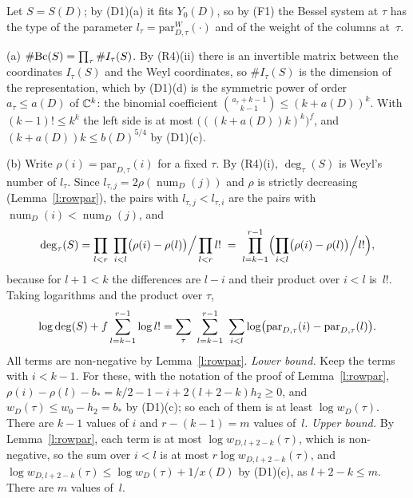 \documentclass[11pt,a4paper]{article}
\makeatletter
\theoremstyle{plainx}
\theoremstyle{uprightx}
\renewenvironment{proof}[1][Proof]{\par\pushQED{\qed}\normalfont\topsep0pt\partopsep0pt
  \trivlist\item[\hskip\labelsep\itshape #1.]\ignorespaces}{\popQED\endtrivlist\@endpefalse}
\newcommand{\Inp}[1]{\textup{(#1)}}
\newcommand{\scx}[1]{x(#1)}
\newcommand{\scb}[1]{b(#1)}
\newcommand{\aD}[1]{a(#1)}
\newcommand{\wt}[3]{w_{#1,#2}(#3)}                    %
\newcommand{\nw}[2]{w_{#1}(#2)}                       %
\newcommand{\rowPar}[3]{\mathrm{par}_{#1,#2}(#3)}     %
\newcommand{\parW}[3]{\mathrm{par}^{W}_{#1,#2}(#3)}   %
\newcommand{\SD}[1]{S(#1)}                            %
\newcommand{\Ys}[2]{Y_{#2}(#1)}                       %
\makeatother
\begin{document}
\begin{proof}[Proof of Theorem F]
Let $S=\SD{D}$; by \Inp{D1}(a) it fits $\Ys{D}{0}$, so by (F1) the Bessel system at $\tau$ has the type of the
parameter $l_\tau=\parW{D}{\tau}{\cdot}$ and of the weight of the columns at~$\tau$.

(a) $\#\mathrm{Bc}(S)=\prod_\tau\#I_\tau(S)$. By \Inp{R4}(ii) there is an invertible matrix between the coordinates $I_\tau(S)$
and the Weyl coordinates, so $\#I_\tau(S)$ is the dimension of the representation, which by \Inp{D1}(d) is the
symmetric power of order $a_\tau\le\aD{D}$ of $\mathbb{C}^{k}$: the binomial coefficient
$\binom{a_\tau+k-1}{k-1}\le(k+\aD{D})^{k}$. With $(k-1)!\le k^{k}$ the left side is at most
$\bigl(((k+\aD{D})k)^{k}\bigr)^{f}$, and $(k+\aD{D})k\le\scb{D}^{5/4}$ by \Inp{D1}(c).

(b) Write $\rho(i)=\rowPar{D}{\tau}{i}$ for a fixed $\tau$. By \Inp{R4}(i), $\deg_\tau(S)$ is Weyl's number of
$l_\tau$. Since $l_{\tau,j}=2\rho(\operatorname{num}_D(j))$ and $\rho$ is strictly decreasing (Lemma~\ref{l:rowpar}), the pairs with
$l_{\tau,j}<l_{\tau,i}$ are the pairs with $\operatorname{num}_D(i)<\operatorname{num}_D(j)$, and
\[\deg_\tau(S)=\prod_{l<r}\ \prod_{i<l}\bigl(\rho(i)-\rho(l)\bigr)\Big/\prod_{l<r}l!\;=\;
\prod_{l=k-1}^{r-1}\Bigl(\prod_{i<l}\bigl(\rho(i)-\rho(l)\bigr)\Big/l!\Bigr),\]
because for $l+1<k$ the differences are $l-i$ and their product over $i<l$ is~$l!$. Taking logarithms and the
product over $\tau$,
\[\log\bdeg{S}+f\sum_{l=k-1}^{r-1}\log l!=\sum_\tau\ \sum_{l=k-1}^{r-1}\ \sum_{i<l}\log\bigl(\rowPar{D}{\tau}{i}-\rowPar{D}{\tau}{l}\bigr).\]
All terms are non-negative by Lemma~\ref{l:rowpar}. \emph{Lower bound.} Keep the terms with $i<k-1$. For these, with
the notation of the proof of Lemma~\ref{l:rowpar}, $\rho(i)-\rho(l)-b_\ast=k/2-1-i+2(l+2-k)h_2\ge0$, and
$\nw{D}{\tau}\le w_0-h_2=b_\ast$ by \Inp{D1}(c); so each of them is at least $\log\nw{D}{\tau}$. There are $k-1$ values
of $i$ and $r-(k-1)=m$ values of~$l$. \emph{Upper bound.} By Lemma~\ref{l:rowpar}, each term is at most
$\log\wt{D}{l+2-k}{\tau}$, which is non-negative, so the sum over $i<l$ is at most $r\log\wt{D}{l+2-k}{\tau}$, and
$\log\wt{D}{l+2-k}{\tau}\le\log\nw{D}{\tau}+1/\scx{D}$ by \Inp{D1}(c), as $l+2-k\le m$. There are $m$ values of~$l$.
\end{proof}
\end{document}
